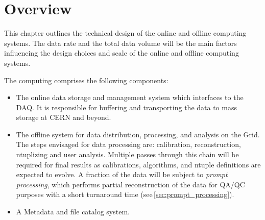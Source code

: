 \section{Overview}


\cite{comp_model}
\cite{data_managm_sys}

This chapter outlines  the technical design of the online and offline computing systems.
The data rate and the total data volume will be the main factors influencing the design choices and scale of the \pd
online and offline computing systems.   

The \pd computing comprises the following components: 
\begin{itemize}

\item The online data storage and management system which interfaces to the DAQ. It is responsible for buffering
and transporting the data to mass storage at CERN and beyond.

\item The offline system for data distribution, processing, and analysis on the Grid.  The steps envisaged for data processing are: 
calibration, reconstruction, ntuplizing and user analysis.  Multiple passes through this chain will be required for final results as
calibrations, algorithms, and ntuple definitions are expected to evolve.
A fraction of the data will be subject to \textit{prompt processing}, which performs partial reconstruction of the data for QA/QC purposes
with a short turnaround time (see\,\ref{sec:prompt_processing}).

\item  A Metadata and file catalog system.
\end{itemize}



